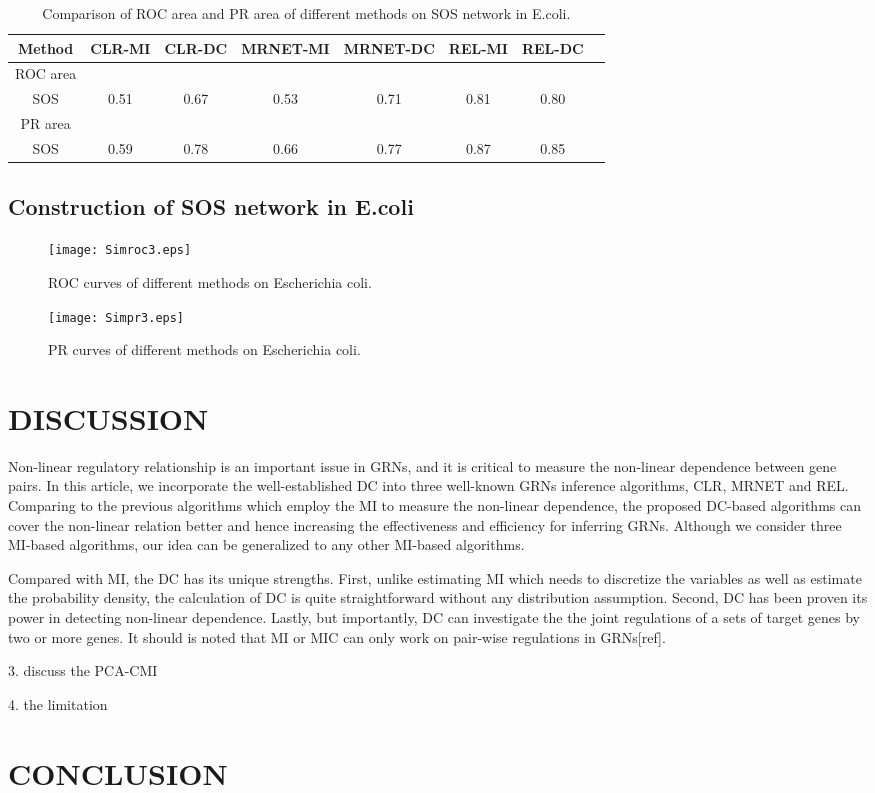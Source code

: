 \documentclass{bioinfo}
\begin{document}
\begin{table}[0.5\textwidth] \tiny
\centering \caption{Comparison of ROC area and PR area of different methods on SOS network in E.coli.}\label{roc-pr}
\begin{tabular}{cccccccc}
 \hline
 Method & CLR-MI & CLR-DC & MRNET-MI & MRNET-DC & REL-MI & REL-DC \\
 \hline
  ROC area\\
  SOS     & 0.51 & 0.67 & 0.53 & 0.71 & 0.81 & 0.80 \\
 PR area\\
  SOS   & 0.59 &0.78 & 0.66 & 0.77 & 0.87 & 0.85 \\
  \hline
\end{tabular}
\end{table}


\subsection{Construction of SOS network in E.coli}
\begin{figure}[!h]
  \texttt{[image: Simroc3.eps]}
  \caption{ROC curves of different methods on Escherichia coli.}\label{roc-sos}
\end{figure}

\begin{figure}[!h]
  \texttt{[image: Simpr3.eps]}
  \caption{PR curves of different methods on Escherichia coli.}\label{pr-sos}
\end{figure}

\section{DISCUSSION}

Non-linear regulatory relationship is an important issue in GRNs, and it is critical to measure the non-linear dependence between gene pairs. In this article,
we incorporate the well-established DC into three well-known GRNs inference algorithms, CLR, MRNET and REL. Comparing to the previous algorithms which employ the MI to measure the non-linear dependence, the proposed DC-based algorithms can cover the non-linear relation better and hence increasing the effectiveness and efficiency for inferring GRNs. Although we consider three MI-based algorithms, our idea can be generalized to any other MI-based algorithms.

Compared with MI, the DC has its unique strengths. First, unlike estimating MI which needs to discretize the variables as well as estimate the probability density, the calculation of DC is quite straightforward without any distribution assumption. Second, DC has been proven its power in detecting non-linear dependence. Lastly, but importantly, DC can investigate the the joint regulations of a sets of target genes by two or more genes. It should is noted that MI or MIC can only work on pair-wise regulations in GRNs[ref].

3. discuss the PCA-CMI

4. the limitation


\section{CONCLUSION}


%
%
%
%
%
%


\end{document}

